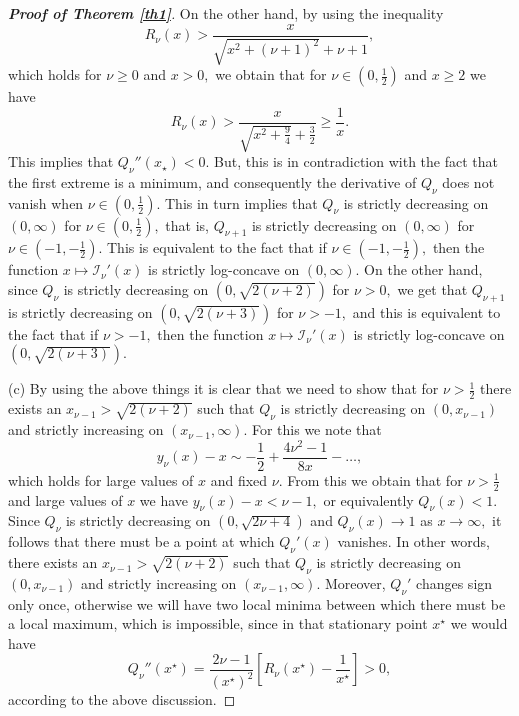 \documentclass[10pt]{amsart}
\begin{document}
\begin{proof}[\bf Proof of Theorem \ref{th1}]
On the other hand, by using the inequality \cite[p. 241]{amos}
$$R_{\nu}(x)>\frac{x}{\sqrt{x^2+\left(\nu+1\right)^2}+\nu+1},$$
which holds for $\nu\geq 0$ and $x>0,$ we obtain that for $\nu\in\left(0,\frac{1}{2}\right)$ and $x\geq2$ we have
$$R_{\nu}(x)>\frac{x}{\sqrt{x^2+\frac{9}{4}}+\frac{3}{2}}\geq\frac{1}{x}.$$
This implies that $Q_{\nu}''(x_{\star})<0.$ But, this is in contradiction with the fact that the first extreme is a minimum, and consequently the derivative of $Q_{\nu}$ does not vanish when $\nu\in\left(0,\frac{1}{2}\right).$ This in turn implies that $Q_{\nu}$ is strictly decreasing on $(0,\infty)$ for $\nu\in\left(0,\frac{1}{2}\right),$ that is, $Q_{\nu+1}$ is strictly decreasing on $(0,\infty)$ for $\nu\in\left(-1,-\frac{1}{2}\right).$ This is equivalent to the fact that if $\nu\in\left(-1,-\frac{1}{2}\right),$ then the function $x\mapsto\mathcal{I}_{\nu}'(x)$ is strictly log-concave on $(0,\infty).$ On the other hand, since $Q_{\nu}$ is strictly decreasing on $\left(0,\sqrt{2(\nu+2)}\right)$ for $\nu>0,$ we get that $Q_{\nu+1}$ is strictly decreasing on $\left(0,\sqrt{2(\nu+3)}\right)$ for $\nu>-1,$ and this is equivalent to the fact that if $\nu>-1,$ then the function $x\mapsto\mathcal{I}_{\nu}'(x)$ is strictly log-concave on $\left(0,\sqrt{2(\nu+3)}\right).$

(c) By using the above things it is clear that we need to show that for $\nu>\frac{1}{2}$ there exists an $x_{\nu-1}>\sqrt{2(\nu+2)}$ such that $Q_{\nu}$ is strictly decreasing on $(0,x_{\nu-1})$ and strictly increasing on $(x_{\nu-1},\infty).$ For this we note that \cite[p. 276]{gronwall}
$$y_{\nu}(x)-x\sim -\frac{1}{2}+\frac{4\nu^2-1}{8x}-\dots,$$
which holds for large values of $x$ and fixed $\nu.$ From this we obtain that for $\nu>\frac{1}{2}$ and large values of $x$ we have
$y_{\nu}(x)-x<\nu-1,$ or equivalently $Q_{\nu}(x)<1.$ Since $Q_{\nu}$ is strictly decreasing on $\left(0,\sqrt{2\nu+4}\right)$ and $Q_{\nu}(x)\to1$ as $x\to\infty,$ it follows that there must be a point at which $Q_{\nu}'(x)$ vanishes. In other words, there exists an $x_{\nu-1}>\sqrt{2(\nu+2)}$ such that $Q_{\nu}$ is strictly decreasing on $(0,x_{\nu-1})$ and strictly increasing on $(x_{\nu-1},\infty).$ Moreover, $Q_{\nu}'$ changes sign only once, otherwise we will have two local minima between which there must be a local maximum, which is impossible, since in that stationary point $x^{\star}$ we would have
$$Q_{\nu}''(x^{\star})=\frac{2\nu-1}{(x^{\star})^2}\left[R_{\nu}(x^{\star})-\frac{1}{x^{\star}}\right]>0,$$
according to the above discussion.
\end{proof}
\end{document}
